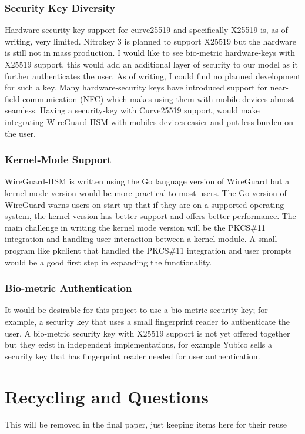 \documentclass [11pt, proquest] {uwthesis}[2020/02/24]
\begin{document}
\subsection{Security Key Diversity}
Hardware security-key support for curve25519 and specifically X25519 is, as of writing, very limited. Nitrokey 3 is planned to support X25519 but the hardware is still not in mass production. I would like to see bio-metric hardware-keys with X25519 support, this would add an additional layer of security to our model as it further authenticates the user. As of writing, I could find no planned development for such a key. Many hardware-security keys have introduced support for near-field-communication (NFC) which makes using them with mobile devices almost seamless. Having a security-key with Curve25519 support, would make integrating WireGuard-HSM with mobiles devices easier and put less burden on the user. 

\subsection{Kernel-Mode Support}
WireGuard-HSM is written using the Go language version of WireGuard but a kernel-mode version would be more practical to most users. The Go-version of WireGuard warns users on start-up that if they are on a supported operating system, the kernel version has better support and offers better performance. The main challenge in writing the kernel mode version will be the PKCS\#11 integration and handling user interaction between a kernel module. A small program like pkclient that handled the PKCS\#11 integration and user prompts would be a good first step in expanding the functionality.

\subsection{Bio-metric Authentication}
It would be desirable for this project to use a bio-metric security key; for example, a security key that uses a small fingerprint reader to authenticate the user. A bio-metric security key with X25519 support is not yet offered together but they exist in independent implementations, for example Yubico sells a security key that has fingerprint reader needed for user authentication\cite{yubico_yubikey_2022}. 

\chapter{Recycling and Questions}
This will be removed in the final paper, just keeping items here for their reuse
\end{document}
